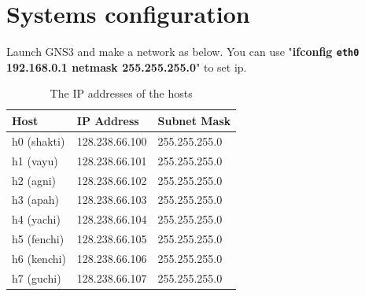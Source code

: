 \documentclass[10pt,a4paper]{article}
\numberwithin{equation}{section}
\numberwithin{figure}{section}
\numberwithin{table}{section}
\begin{document}
\section*{Systems configuration}
Launch GNS3 and make a network as below. You can use "\textbf{ifconfig \texttt{eth0} 192.168.0.1 netmask 255.255.255.0}" to set ip.
\begin{center}
    \begin{minipage}{0.48\textwidth}
        \begin{flushleft}
\begin{table}[H]
    \caption{The IP addresses of the hosts}
    \vspace{5pt}
    \centering
    \begin{tabular}{ l l l }
        \hline \hline
        Host & IP Address & Subnet Mask \\
        \hline 
        h0 (shakti) & 128.238.66.100 & 255.255.255.0 \\
        h1 (vayu) & 128.238.66.101 & 255.255.255.0 \\
        h2 (agni) & 128.238.66.102 & 255.255.255.0 \\
        h3 (apah) & 128.238.66.103 & 255.255.255.0 \\
        h4 (yachi) & 128.238.66.104 & 255.255.255.0 \\
        h5 (fenchi) & 128.238.66.105 & 255.255.255.0 \\
        h6 (kenchi) & 128.238.66.106 & 255.255.255.0 \\
        h7 (guchi) & 128.238.66.107 & 255.255.255.0 \\
        \hline \hline
        \end{tabular}
\end{table}
        \end{flushleft}
    \end{minipage}
    \begin{minipage}{0.48\textwidth}
        \begin{flushright}
\begin{figure}[H]
    \centering
\end{figure}
\end{flushright}
\end{minipage}
\end{center}
\end{document}
